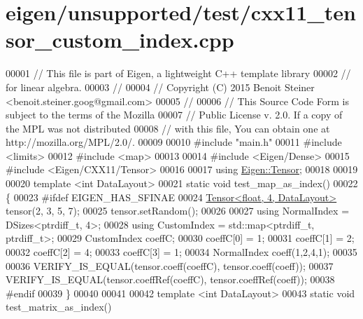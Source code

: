 \hypertarget{eigen_2unsupported_2test_2cxx11__tensor__custom__index_8cpp_source}{}\section{eigen/unsupported/test/cxx11\+\_\+tensor\+\_\+custom\+\_\+index.cpp}
\label{eigen_2unsupported_2test_2cxx11__tensor__custom__index_8cpp_source}

\begin{DoxyCode}
00001 \textcolor{comment}{// This file is part of Eigen, a lightweight C++ template library}
00002 \textcolor{comment}{// for linear algebra.}
00003 \textcolor{comment}{//}
00004 \textcolor{comment}{// Copyright (C) 2015 Benoit Steiner <benoit.steiner.goog@gmail.com>}
00005 \textcolor{comment}{//}
00006 \textcolor{comment}{// This Source Code Form is subject to the terms of the Mozilla}
00007 \textcolor{comment}{// Public License v. 2.0. If a copy of the MPL was not distributed}
00008 \textcolor{comment}{// with this file, You can obtain one at http://mozilla.org/MPL/2.0/.}
00009 
00010 \textcolor{preprocessor}{#include "main.h"}
00011 \textcolor{preprocessor}{#include <limits>}
00012 \textcolor{preprocessor}{#include <map>}
00013 
00014 \textcolor{preprocessor}{#include <Eigen/Dense>}
00015 \textcolor{preprocessor}{#include <Eigen/CXX11/Tensor>}
00016 
00017 \textcolor{keyword}{using} \hyperlink{class_eigen_1_1_tensor}{Eigen::Tensor};
00018 
00019 
00020 \textcolor{keyword}{template} <\textcolor{keywordtype}{int} DataLayout>
00021 \textcolor{keyword}{static} \textcolor{keywordtype}{void} test\_map\_as\_index()
00022 \{
00023 \textcolor{preprocessor}{#ifdef EIGEN\_HAS\_SFINAE}
00024   \hyperlink{class_eigen_1_1_tensor}{Tensor<float, 4, DataLayout>} tensor(2, 3, 5, 7);
00025   tensor.setRandom();
00026 
00027   \textcolor{keyword}{using} NormalIndex = DSizes<ptrdiff\_t, 4>;
00028   \textcolor{keyword}{using} CustomIndex = std::map<ptrdiff\_t, ptrdiff\_t>;
00029   CustomIndex coeffC;
00030   coeffC[0] = 1;
00031   coeffC[1] = 2;
00032   coeffC[2] = 4;
00033   coeffC[3] = 1;
00034   NormalIndex coeff(1,2,4,1);
00035 
00036   VERIFY\_IS\_EQUAL(tensor.coeff(coeffC), tensor.coeff(coeff));
00037   VERIFY\_IS\_EQUAL(tensor.coeffRef(coeffC), tensor.coeffRef(coeff));
00038 \textcolor{preprocessor}{#endif}
00039 \}
00040 
00041 
00042 \textcolor{keyword}{template} <\textcolor{keywordtype}{int} DataLayout>
00043 \textcolor{keyword}{static} \textcolor{keywordtype}{void} test\_matrix\_as\_index()

\end{DoxyCode}
